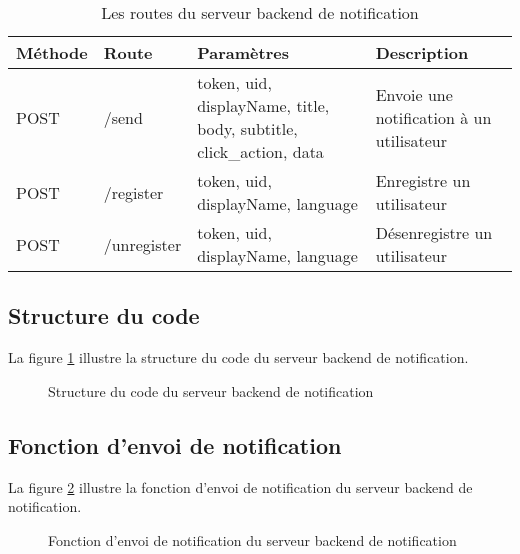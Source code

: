 \begin{table}[H]
    \caption{Les routes du serveur backend de notification}
    \label{appendix:backend_notification_routes}
    \centering
    \begin{tabular}{|l|l|p{6cm}|p{6cm}|}
    \hline
    Méthode & Route & Paramètres & Description \\ \hline
    POST & /send & token, uid, displayName, title, body, subtitle, click\_action, data & Envoie une notification à un utilisateur \\ \hline
    POST & /register & token, uid, displayName, language & Enregistre un utilisateur \\ \hline
    POST & /unregister & token, uid, displayName, language & Désenregistre un utilisateur \\ \hline
    \end{tabular}
    
\end{table}

\subsection{Structure du code}
La figure \ref{appendix:backend_notification_structure} illustre la structure du code du serveur backend de notification.

\begin{figure}[H]
    \centering
    \caption{Structure du code du serveur backend de notification}
    \label{appendix:backend_notification_structure}
\end{figure}


\subsection{Fonction d'envoi de notification}

La figure \ref{appendix:backend_notification_send} illustre la fonction d'envoi de notification du serveur backend de notification.

\begin{figure}[H]
    \centering
    \caption{Fonction d'envoi de notification du serveur backend de notification}
    \label{appendix:backend_notification_send}
\end{figure}
